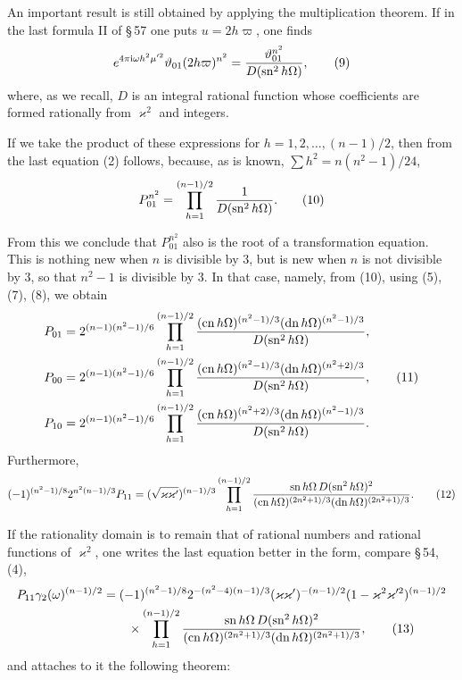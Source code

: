 \documentclass[11pt]{article}
\providecommand{\sn}{\operatorname{sn}}
\providecommand{\cn}{\operatorname{cn}}
\providecommand{\dn}{\operatorname{dn}}
\providecommand{\ii}{\mathrm{i}}
\begin{document}
An important result is still obtained by applying the multiplication theorem. If in the last formula II of \S\,57 one puts $u=2h\varpi$, one finds
\begin{equation}
e^{4\pi\ii\omega h^2\mu'^2}\vartheta_{01}(2h\varpi)^{n^2}={\vartheta_{01}^{n^2}\over D(\sn^2 h\Omega)},
\tag{9}
\end{equation}
where, as we recall, $D$ is an integral rational function whose coefficients are formed rationally from $\varkappa^2$ and integers.

If we take the product of these expressions for $h=1,2,\ldots,(n-1)/2$, then from the last equation (2) follows, because, as is known, $\sum h^2=n(n^2-1)/24$,
\begin{equation}
P_{01}^{n^2}=\prod_{h=1}^{(n-1)/2}{1\over D(\sn^2 h\Omega)}.
\tag{10}
\end{equation}

From this we conclude that $P_{01}^{n^2}$ also is the root of a transformation equation. This is nothing new when $n$ is divisible by $3$, but is new when $n$ is not divisible by $3$, so that $n^2-1$ is divisible by $3$. In that case, namely, from (10), using (5), (7), (8), we obtain
\begin{align}
P_{01}&=2^{(n-1)(n^2-1)/6}
\prod_{h=1}^{(n-1)/2}{(\cn h\Omega)^{(n^2-1)/3}(\dn h\Omega)^{(n^2-1)/3}\over D(\sn^2h\Omega)},\notag\\
P_{00}&=2^{(n-1)(n^2-1)/6}
\prod_{h=1}^{(n-1)/2}{(\cn h\Omega)^{(n^2-1)/3}(\dn h\Omega)^{(n^2+2)/3}\over D(\sn^2h\Omega)},\tag{11}\\
P_{10}&=2^{(n-1)(n^2-1)/6}
\prod_{h=1}^{(n-1)/2}{(\cn h\Omega)^{(n^2+2)/3}(\dn h\Omega)^{(n^2-1)/3}\over D(\sn^2h\Omega)}.\notag
\end{align}
Furthermore,
\begin{equation}
(-1)^{(n^2-1)/8}2^{n^2(n-1)/3}P_{11}
=(\sqrt{\varkappa\varkappa'})^{(n-1)/3}
\prod_{h=1}^{(n-1)/2}{\sn h\Omega\,D(\sn^2h\Omega)^2\over
(\cn h\Omega)^{(2n^2+1)/3}(\dn h\Omega)^{(2n^2+1)/3}}.
\tag{12}
\end{equation}

If the rationality domain is to remain that of rational numbers and rational functions of $\varkappa^2$, one writes the last equation better in the form, compare \S\,54, (4),
\begin{align}
P_{11}\gamma_2(\omega)^{(n-1)/2}
&=(-1)^{(n^2-1)/8}2^{-(n^2-4)(n-1)/3}
(\varkappa\varkappa')^{-(n-1)/2}(1-\varkappa^2\varkappa'^2)^{(n-1)/2}\notag\\
&\qquad\times
\prod_{h=1}^{(n-1)/2}{\sn h\Omega\,D(\sn^2h\Omega)^2\over
(\cn h\Omega)^{(2n^2+1)/3}(\dn h\Omega)^{(2n^2+1)/3}},
\tag{13}
\end{align}
and attaches to it the following theorem:
\end{document}
